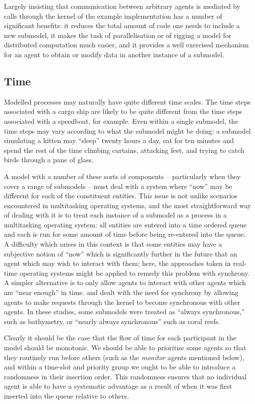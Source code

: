 Largely insisting that communication between arbitrary agents is
mediated by calls through the kernel of the example implementation has
a number of significant benefits: it reduces the total amount of code
one needs to include a new submodel, it makes the task of
parallelisation or of rigging a model for distributed computation much
easier, and it provides a well exercised mechanism for an agent to
obtain or modify data in another instance of a submodel.

\subsection{Time}
Modelled processes may naturally have quite different time
scales. The time steps associated with a cargo ship are likely to be
quite different from the time steps associated with a speedboat, for
example. Even within a single submodel, the time steps may vary
according to what the submodel might be doing: a submodel simulating
a kitten may ``sleep'' twenty hours a day, eat for ten minutes and 
spend the rest of the time climbing curtains, attacking feet, and
trying to catch birds through a pane of glass.

A model with a number of these sorts of components -- particularly
when they cover a range of submodels -- must deal with a system where
``now'' may be different for each of the constituent entities. This
issue is not unlike scenarios encountered in multitasking operating
systems, and the most straightforward way of dealing with it is to
treat each instance of a submodel as a process in a multitasking
operating system: all entities are entered into a time ordered queue
and each is run for some amount of time before being re-entered into
the queue.  A difficulty which arises in this context is that some
entities may have a subjective notion of ``now'' which is
significantly further in the future that an agent which may
wish to interact with them; here, the approaches taken in real-time
operating systems might be applied to remedy this problem with
synchrony.  A simpler alternative is to only allow agents to interact
with other agents which are ``near enough'' in time. \Cite{gray2014}
and \Cite{gray2006nws} dealt with the need for synchrony by allowing
agents to make requests through the kernel to become synchronous with
other agents.  In these studies, some submodels were treated as
``always synchronous,'' such as bathymetry, or ``nearly always
synchronous'' such as coral reefs.

Clearly it should be the case that the flow of time for each
participant in the model should be monotonic. We should be able to
prioritise some agents so that they routinely run before others (such
as the \textit{monitor} agents mentioned below), and within a
time-slot and priority group we ought to be able to introduce a
randomness in their insertion order.  This randomness ensures that no
individual agent is able to have a systematic advantage as a result of
when it was first inserted into the queue relative to others.

